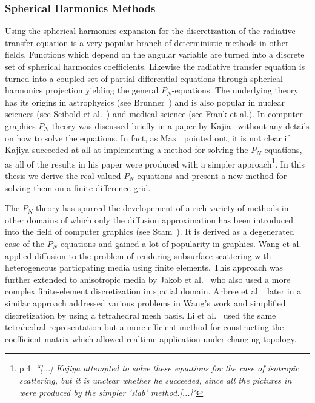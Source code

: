 \subsubsection*{Spherical Harmonics Methods}
Using the spherical harmonics expansion for the discretization of the radiative transfer equation is a very popular branch of deterministic methods in other fields. Functions which depend on the angular variable are turned into a discrete set of spherical harmonics coefficients. Likewise the radiative transfer equation is turned into a coupled set of partial differential equations through spherical harmonics projection yielding the general $P_N$-equations. The underlying theory has its origins in astrophysics (see Brunner~\cite{Brunner02}) and is also popular in nuclear sciences (see Seibold et al.~\cite{Seibold14}) and medical science (see Frank et al.\cite{Frank08}). In computer graphics $P_N$-theory was discussed briefly in a paper by Kajia~\cite{Kajiya84} without any details on how to solve the equations. In fact, as Max~\cite{Max95} pointed out, it is not clear if Kajiya succeeded at all at implementing a method for solving the $P_N$-equations, as all of the results in his paper were produced with a simpler approach\footnote{\cite{Max95} p.4: \emph{``[...] Kajiya attempted to solve these equations for the case of isotropic scattering, but it is unclear whether he succeeded, since all the pictures in \cite{Kajiya84} were produced by the simpler 'slab' method.[...]"}}. In this thesis we derive the real-valued $P_N$-equations and present a new method for solving them on a finite difference grid. 

The $P_N$-theory has spurred the developement of a rich variety of methods in other domains of which only the diffusion approximation has been introduced into the field of computer graphics (see Stam~\cite{Stam95}). It is derived as a degenerated case of the $P_N$-equations and gained a lot of popularity in graphics. Wang et al.~\cite{Wang08} applied diffusion to the problem of rendering subsurface scattering with heterogeneous particpating media using finite elements. This approach was further extended to anisotropic media by Jakob et al.~\cite{Jakob10} who also used a more complex finite-element discretization in spatial domain. Arbree et al.~\cite{Arbree11} later in a similar approach addressed various problems in Wang's work and simplified discretization by using a tetrahedral mesh basis. Li et al.~\cite{Li13} used the same tetrahedral representation but a more efficient method for constructing the coefficient matrix which allowed realtime application under changing topology.

